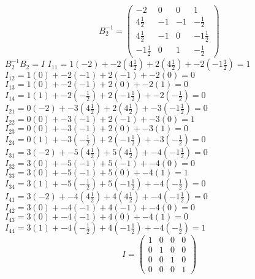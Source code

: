 \documentclass[12pt]{article}
\begin{document}
\begin{itemize}
\[
B_2^{-1} = 
\begin{pmatrix}
-2 & 0 & 0 & 1\\
4\frac{1}{2} & -1 & -1 & -\frac{1}{2} \\
4\frac{1}{2} & -1 & 0 & -1\frac{1}{2} \\
-1\frac{1}{2} & 0 & 1 & -\frac{1}{2}
\end{pmatrix}
\]
$B_2^{-1}B_2=I$
\newline $I_{11}=1(-2)+-2(4\frac{1}{2})+2(4\frac{1}{2})+-2(-1\frac{1}{2})=1$
\newline $I_{12}=1(0)+-2(-1)+2(-1)+-2(0)=0$
\newline $I_{13}=1(0)+-2(-1)+2(0)+-2(1)=0$
\newline $I_{14}=1(1)+-2(-\frac{1}{2})+2(-1\frac{1}{2})+-2(-\frac{1}{2})=0$
\newline $I_{21}=0(-2)+-3(4\frac{1}{2})+2(4\frac{1}{2})+-3(-1\frac{1}{2})=0$
\newline $I_{22}=0(0)+-3(-1)+2(-1)+-3(0)=1$
\newline $I_{23}=0(0)+-3(-1)+2(0)+-3(1)=0$
\newline $I_{24}=0(1)+-3(-\frac{1}{2})+2(-1\frac{1}{2})+-3(-\frac{1}{2})=0$
\newline $I_{31}=3(-2)+-5(4\frac{1}{2})+5(4\frac{1}{2})+-4(-1\frac{1}{2})=0$
\newline $I_{32}=3(0)+-5(-1)+5(-1)+-4(0)=0$
\newline $I_{33}=3(0)+-5(-1)+5(0)+-4(1)=1$
\newline $I_{34}=3(1)+-5(-\frac{1}{2})+5(-1\frac{1}{2})+-4(-\frac{1}{2})=0$
\newline $I_{41}=3(-2)+-4(4\frac{1}{2})+4(4\frac{1}{2})+-4(-1\frac{1}{2})=0$
\newline $I_{42}=3(0)+-4(-1)+4(-1)+-4(0)=0$
\newline $I_{43}=3(0)+-4(-1)+4(0)+-4(1)=0$
\newline $I_{44}=3(1)+-4(-\frac{1}{2})+4(-1\frac{1}{2})+-4(-\frac{1}{2})=1$
\[
I = 
\begin{pmatrix}
1 & 0 & 0 & 0\\
0 & 1 & 0 & 0 \\
0 & 0 & 1 & 0 \\
0 & 0 & 0 & 1
\end{pmatrix}
\]


\end{itemize}
\end{document}
